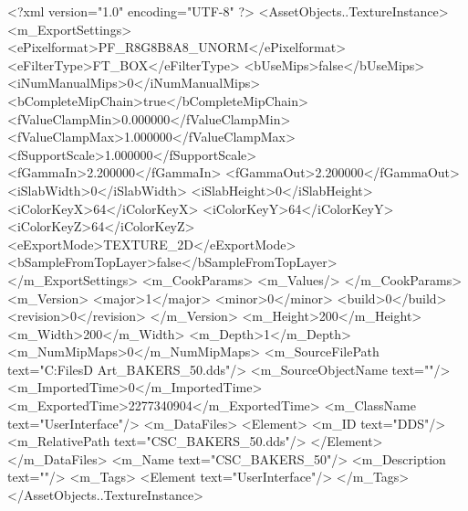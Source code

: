 <?xml version="1.0" encoding="UTF-8" ?>
<AssetObjects..TextureInstance>
	<m_ExportSettings>
		<ePixelformat>PF_R8G8B8A8_UNORM</ePixelformat>
		<eFilterType>FT_BOX</eFilterType>
		<bUseMips>false</bUseMips>
		<iNumManualMips>0</iNumManualMips>
		<bCompleteMipChain>true</bCompleteMipChain>
		<fValueClampMin>0.000000</fValueClampMin>
		<fValueClampMax>1.000000</fValueClampMax>
		<fSupportScale>1.000000</fSupportScale>
		<fGammaIn>2.200000</fGammaIn>
		<fGammaOut>2.200000</fGammaOut>
		<iSlabWidth>0</iSlabWidth>
		<iSlabHeight>0</iSlabHeight>
		<iColorKeyX>64</iColorKeyX>
		<iColorKeyY>64</iColorKeyY>
		<iColorKeyZ>64</iColorKeyZ>
		<eExportMode>TEXTURE_2D</eExportMode>
		<bSampleFromTopLayer>false</bSampleFromTopLayer>
	</m_ExportSettings>
	<m_CookParams>
		<m_Values/>
	</m_CookParams>
	<m_Version>
		<major>1</major>
		<minor>0</minor>
		<build>0</build>
		<revision>0</revision>
	</m_Version>
	<m_Height>200</m_Height>
	<m_Width>200</m_Width>
	<m_Depth>1</m_Depth>
	<m_NumMipMaps>0</m_NumMipMaps>
	<m_SourceFilePath text="C:\Users\Shadow\Desktop\Working Files\2D Art\Quarters\Bakers\CSC_BAKERS_50.dds"/>
	<m_SourceObjectName text=""/>
	<m_ImportedTime>0</m_ImportedTime>
	<m_ExportedTime>2277340904</m_ExportedTime>
	<m_ClassName text="UserInterface"/>
	<m_DataFiles>
		<Element>
			<m_ID text="DDS"/>
			<m_RelativePath text="CSC_BAKERS_50.dds"/>
		</Element>
	</m_DataFiles>
	<m_Name text="CSC_BAKERS_50"/>
	<m_Description text=""/>
	<m_Tags>
		<Element text="UserInterface"/>
	</m_Tags>
</AssetObjects..TextureInstance>

